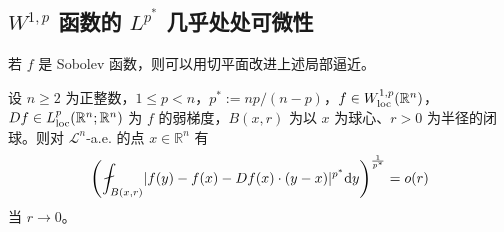 \documentclass[../../main.tex]{subfiles}%
\begin{document}
\subsection{$W^{1,p}$ 函数的 $L^{p^{*}}$ 几乎处处可微性}\label{subsection:ch06-01-2}

若 $f$ 是 Sobolev 函数，则可以用切平面改进上述局部逼近。

\begin{theorem}\label{theorem:ch06-6-2}
设 $n\geqslant2$ 为正整数，$1\leqslant p<n$，$p^{*}:=np/(n-p)$，$f\in W^{1,p}_{\mathrm{loc}}(\mathbb{R}^n)$，$Df\in L^p_{\mathrm{loc}}(\mathbb{R}^n;\mathbb{R}^n)$ 为 $f$ 的弱梯度，$B(x,r)$ 为以 $x$ 为球心、$r>0$ 为半径的闭球。则对 $\mathcal{L}^n$-a.e. 的点 $x\in\mathbb{R}^n$ 有
\begin{align*}
\left(\fint_{B(x,r)}\lvert f(y)-f(x)-Df(x)\cdot(y-x)\rvert^{p^{*}}\diff y\right)^{\frac{1}{p^{*}}}=o(r)
\end{align*}
当 $r\to0$。
\end{theorem}
\end{document}

